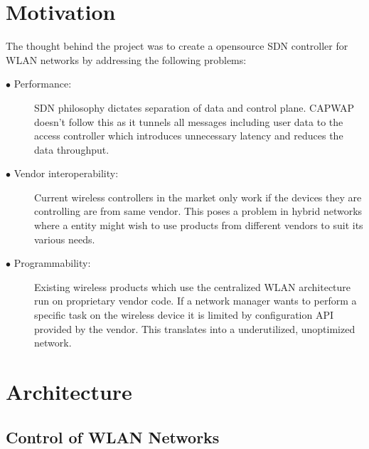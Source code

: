 \documentclass[12pt]{article}
\begin{document}
    \section{Motivation}
    The thought behind the project was to create a opensource SDN controller for WLAN networks by addressing the following problems:
    \begin{description}
    	\item[$\bullet$ Performance:] SDN philosophy dictates separation of data and control plane. CAPWAP  doesn't follow this as it tunnels all messages including user data to the access controller which introduces unnecessary latency and reduces the data throughput.
    	
    	\item[$\bullet$ Vendor interoperability:] Current wireless controllers in the market only work if the devices they are controlling are from same vendor. This poses a problem in hybrid networks where a entity might wish to use products from different vendors to suit its various needs.
    	 
    	 \item[$\bullet$ Programmability:] Existing wireless products which use the centralized WLAN architecture run on proprietary vendor code. If a network manager wants to perform a specific task on the wireless device it is limited by configuration API provided by the vendor. This translates into a underutilized, unoptimized network.
    \end{description}
    
    
     
    
    \section{Architecture}
\subsection{Control of WLAN Networks}
\end{document}
